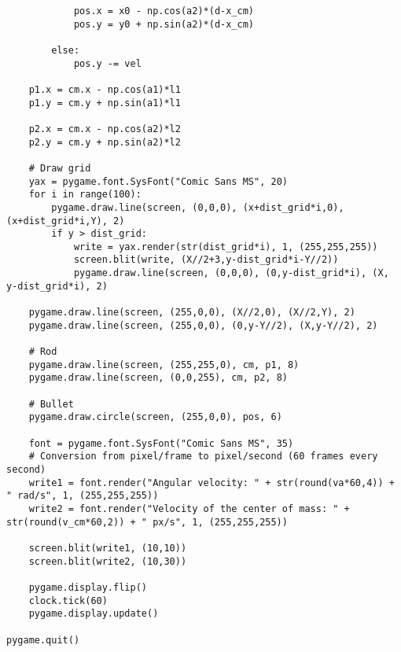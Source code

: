 \documentclass[]{article}
\begin{document}
\begin{lstlisting}
            pos.x = x0 - np.cos(a2)*(d-x_cm)
            pos.y = y0 + np.sin(a2)*(d-x_cm)

        else:
            pos.y -= vel

    p1.x = cm.x - np.cos(a1)*l1
    p1.y = cm.y + np.sin(a1)*l1

    p2.x = cm.x - np.cos(a2)*l2
    p2.y = cm.y + np.sin(a2)*l2

    # Draw grid
    yax = pygame.font.SysFont("Comic Sans MS", 20)
    for i in range(100):
        pygame.draw.line(screen, (0,0,0), (x+dist_grid*i,0), (x+dist_grid*i,Y), 2)
        if y > dist_grid:
            write = yax.render(str(dist_grid*i), 1, (255,255,255))
            screen.blit(write, (X//2+3,y-dist_grid*i-Y//2))
            pygame.draw.line(screen, (0,0,0), (0,y-dist_grid*i), (X, y-dist_grid*i), 2)

    pygame.draw.line(screen, (255,0,0), (X//2,0), (X//2,Y), 2)
    pygame.draw.line(screen, (255,0,0), (0,y-Y//2), (X,y-Y//2), 2)

    # Rod
    pygame.draw.line(screen, (255,255,0), cm, p1, 8)
    pygame.draw.line(screen, (0,0,255), cm, p2, 8)

    # Bullet
    pygame.draw.circle(screen, (255,0,0), pos, 6)

    font = pygame.font.SysFont("Comic Sans MS", 35)
    # Conversion from pixel/frame to pixel/second (60 frames every second)
    write1 = font.render("Angular velocity: " + str(round(va*60,4)) + " rad/s", 1, (255,255,255))
    write2 = font.render("Velocity of the center of mass: " + str(round(v_cm*60,2)) + " px/s", 1, (255,255,255))

    screen.blit(write1, (10,10))
    screen.blit(write2, (10,30))

    pygame.display.flip()
    clock.tick(60)
    pygame.display.update()

pygame.quit()
\end{lstlisting}
\end{document}
